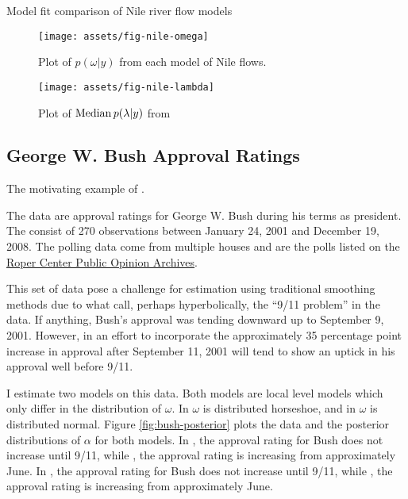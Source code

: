 \documentclass{article}
\begin{document}
\begin{table}[htpb]
  \centering
  
  \caption{Model fit comparison of Nile river flow models}
  \label{tab:nile-fits}
\end{table}

\begin{figure}[htpb]
  \centering
  \texttt{[image: assets/fig-nile-omega]}
  \caption{Plot of $p(\omega | y)$ from each model of Nile flows.}
  \label{fig:nile-omega}
\end{figure}

\begin{figure}[htpb]
  \centering
  \texttt{[image: assets/fig-nile-lambda]}
  \caption{Plot of $\operatorname{Median} p(\lambda | y)$ from }
  \label{fig:nile-lambda}
\end{figure}

\clearpage{}

\subsection{George W. Bush Approval Ratings}
\label{sec:george-w.-bush}

The motivating example of \textcite{RatkovicEng2010}.

The data are approval ratings for George W. Bush during his terms as president.
The consist of 270 observations between January 24, 2001 and December 19, 2008.%
The polling data come from multiple houses and are the polls listed on the \href{http://webapps.ropercenter.uconn.edu/CFIDE/roper/presidential/webroot/presidential_rating_domegail.cfm?allRate=True&presidentName=Bush#.UbeB8HUbyv8}{Roper Center Public Opinion Archives}.

This set of data pose a challenge for estimation using traditional smoothing methods due to what \textcite{RatkovicEng2010} call, perhaps hyperbolically, the ``9/11 problem'' in the data.
If anything, Bush's approval was tending downward up to September 9, 2001.
However, in an effort to incorporate the approximately 35 percentage point increase in approval after September 11, 2001 will tend to show an uptick in his approval well before 9/11.

I estimate two models on this data. 
Both models are local level models which only differ in the distribution of $\omega$.
In  $\omega$ is distributed horseshoe, and in  $\omega$ is distributed normal.
Figure \ref{fig:bush-posterior} plots the data and the posterior distributions of $\alpha$ for both models.
In , the approval rating for Bush does not increase until 9/11, while , the approval rating is increasing from approximately June.
In , the approval rating for Bush does not increase until 9/11, while , the approval rating is increasing from approximately June.
\end{document}
